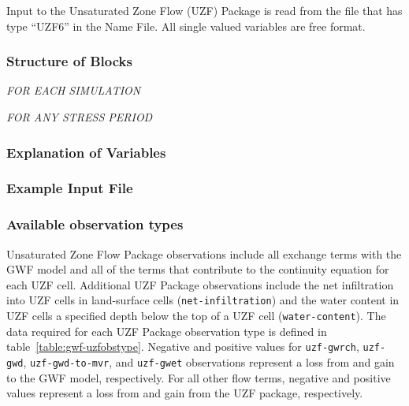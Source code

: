 Input to the Unsaturated Zone Flow (UZF) Package is read from the file that has type ``UZF6'' in the Name File. All single valued variables are free format.

\vspace{5mm}
\subsubsection{Structure of Blocks}
\vspace{5mm}

\noindent \textit{FOR EACH SIMULATION}




\vspace{5mm}
\noindent \textit{FOR ANY STRESS PERIOD}


\vspace{5mm}
\subsubsection{Explanation of Variables}
\begin{description}

\end{description}

\vspace{5mm}
\subsubsection{Example Input File}


\vspace{5mm}
\subsubsection{Available observation types}
Unsaturated Zone Flow Package observations include all exchange terms with the GWF model and all of the terms that contribute to the continuity equation for each UZF cell. Additional UZF Package observations include the net infiltration into UZF cells in land-surface cells (\texttt{net-infiltration}) and the water content in UZF cells a specified depth below the top of a UZF cell (\texttt{water-content}). The data required for each UZF Package observation type is defined in table~\ref{table:gwf-uzfobstype}. Negative and positive values for \texttt{uzf-gwrch}, \texttt{uzf-gwd}, \texttt{uzf-gwd-to-mvr}, and \texttt{uzf-gwet} observations represent a loss from and gain to the GWF model, respectively. For all other flow terms, negative and positive values represent a loss from and gain from the UZF package, respectively.

